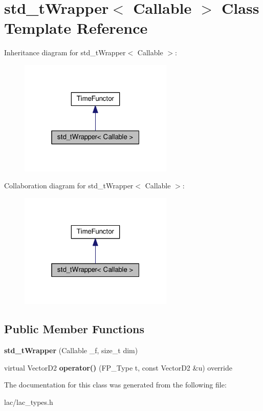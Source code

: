 \hypertarget{classstd__tWrapper}{}\section{std\+\_\+t\+Wrapper$<$ Callable $>$ Class Template Reference}
\label{classstd__tWrapper}


Inheritance diagram for std\+\_\+t\+Wrapper$<$ Callable $>$\+:\nopagebreak
\begin{figure}[H]
\begin{center}
\leavevmode
\includegraphics[width=208pt]{classstd__tWrapper__inherit__graph}
\end{center}
\end{figure}


Collaboration diagram for std\+\_\+t\+Wrapper$<$ Callable $>$\+:\nopagebreak
\begin{figure}[H]
\begin{center}
\leavevmode
\includegraphics[width=208pt]{classstd__tWrapper__coll__graph}
\end{center}
\end{figure}
\subsection*{Public Member Functions}
\begin{DoxyCompactItemize}
\item 
\mbox{\label{classstd__tWrapper_aa4e484b6b5b315e862e485dbebf1fe68}} 
{\bfseries std\+\_\+t\+Wrapper} (Callable \+\_\+f, size\+\_\+t dim)
\item 
\mbox{\label{classstd__tWrapper_a45df822834b50040f986495ec1c8236e}} 
virtual Vector\+D2 {\bfseries operator()} (F\+P\+\_\+\+Type t, const Vector\+D2 \&u) override
\end{DoxyCompactItemize}


The documentation for this class was generated from the following file\+:\begin{DoxyCompactItemize}
\item 
lac/lac\+\_\+types.\+h\end{DoxyCompactItemize}
